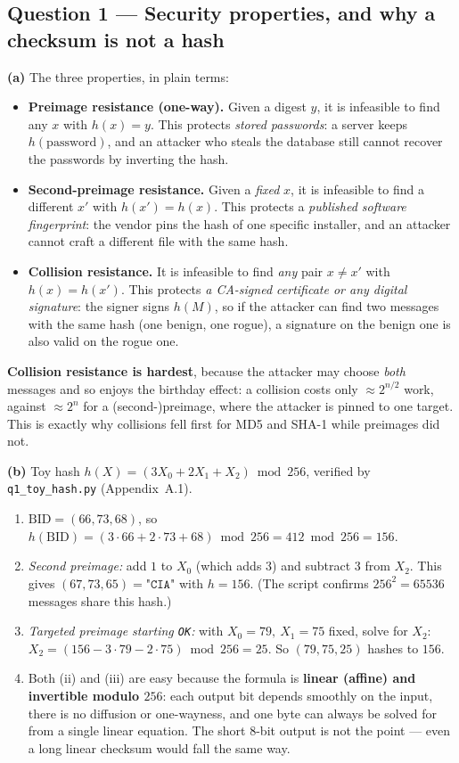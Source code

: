 \documentclass[11pt,a4paper]{article}
\begin{document}
\subsection*{Question 1 --- Security properties, and why a checksum is not a hash}
\textbf{(a)} The three properties, in plain terms:
\begin{itemize}
\item \textbf{Preimage resistance (one-way).} Given a digest $y$, it is infeasible to find any $x$ with
$h(x)=y$. This protects \emph{stored passwords}: a server keeps $h(\text{password})$, and an attacker who
steals the database still cannot recover the passwords by inverting the hash.
\item \textbf{Second-preimage resistance.} Given a \emph{fixed} $x$, it is infeasible to find a different
$x'$ with $h(x')=h(x)$. This protects a \emph{published software fingerprint}: the vendor pins the hash of
one specific installer, and an attacker cannot craft a different file with the same hash.
\item \textbf{Collision resistance.} It is infeasible to find \emph{any} pair $x\neq x'$ with
$h(x)=h(x')$. This protects \emph{a CA-signed certificate or any digital signature}: the signer signs
$h(M)$, so if the attacker can find two messages with the same hash (one benign, one rogue), a signature
on the benign one is also valid on the rogue one.
\end{itemize}
\textbf{Collision resistance is hardest}, because the attacker may choose \emph{both} messages and so
enjoys the birthday effect: a collision costs only $\approx 2^{n/2}$ work, against $\approx 2^{n}$ for a
(second-)preimage, where the attacker is pinned to one target. This is exactly why collisions fell first
for MD5 and SHA-1 while preimages did not.

\textbf{(b)} Toy hash $h(X)=(3X_0+2X_1+X_2)\bmod 256$, verified by \texttt{q1\_toy\_hash.py}
(Appendix~A.1).
\begin{enumerate}[label=(\roman*)]
\item $\mathrm{BID}=(66,73,68)$, so $h(\mathrm{BID}) = (3\cdot 66 + 2\cdot 73 + 68)\bmod 256 = 412\bmod
256 = \boxed{156}$.
\item \emph{Second preimage:} add $1$ to $X_0$ (which adds $3$) and subtract $3$ from $X_2$. This gives
$(67,73,65)=\texttt{"CIA"}$ with $h=156$. (The script confirms $256^2=65536$ messages share this hash.)
\item \emph{Targeted preimage starting \texttt{OK}:} with $X_0=79,\ X_1=75$ fixed, solve for $X_2$:
$X_2 = (156 - 3\cdot 79 - 2\cdot 75)\bmod 256 = 25$. So $(79,75,25)$ hashes to $156$.
\item Both (ii) and (iii) are easy because the formula is \textbf{linear (affine) and invertible modulo
$256$}: each output bit depends smoothly on the input, there is no diffusion or one-wayness, and one
byte can always be solved for from a single linear equation. The short 8-bit output is not the point ---
even a long linear checksum would fall the same way.
\end{enumerate}
\end{document}
